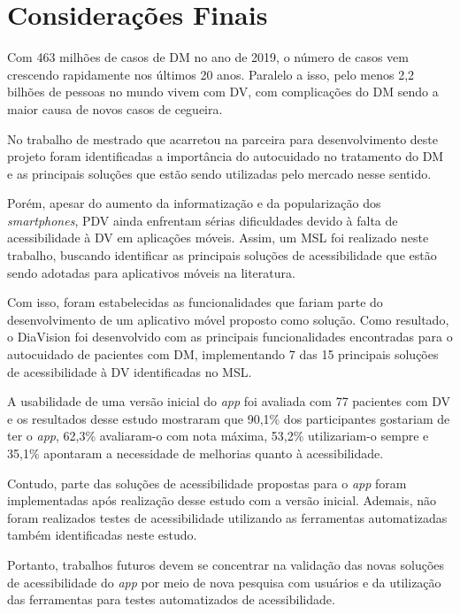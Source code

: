 \chapter{Considerações Finais}
\label{ch:conclusion}

Com 463 milhões de casos de DM no ano de 2019, o número de casos vem crescendo rapidamente nos últimos 20 anos.
Paralelo a isso, pelo menos 2,2 bilhões de pessoas no mundo vivem com DV\@, com complicações do DM sendo
a maior causa de novos casos de cegueira.

No trabalho de mestrado que acarretou na parceira para desenvolvimento deste projeto foram identificadas a importância
do autocuidado no tratamento do DM e as principais soluções que estão sendo utilizadas pelo mercado nesse sentido.

Porém, apesar do aumento da informatização e da popularização dos \emph{smartphones},
PDV ainda enfrentam sérias dificuldades devido à falta de acessibilidade à DV em aplicações móveis. Assim, um MSL foi realizado
neste trabalho, buscando identificar as principais soluções de acessibilidade que estão sendo adotadas para
aplicativos móveis na literatura. 

Com isso, foram estabelecidas as funcionalidades que fariam parte do desenvolvimento de um aplicativo
móvel proposto como solução. Como resultado, o DiaVision foi desenvolvido com as principais
funcionalidades encontradas para o autocuidado de pacientes com DM, implementando 7 das 15 principais soluções
de acessibilidade à DV identificadas no MSL\@.

A usabilidade de uma versão inicial do \emph{app} foi avaliada com 77 pacientes com DV e os resultados
desse estudo mostraram que 90,1\% dos participantes gostariam de ter o \emph{app}, 62,3\% avaliaram-o com nota
máxima, 53,2\% utilizariam-o sempre e 35,1\% apontaram a necessidade de melhorias quanto à acessibilidade.

Contudo, parte das soluções de acessibilidade propostas para o \emph{app} foram implementadas após realização
desse estudo com a versão inicial. Ademais, não foram realizados testes de acessibilidade utilizando
as ferramentas automatizadas também identificadas neste estudo.

Portanto, trabalhos futuros devem se concentrar na validação das novas soluções de acessibilidade do \emph{app}
por meio de nova pesquisa com usuários e da utilização das ferramentas para testes automatizados de acessibilidade.